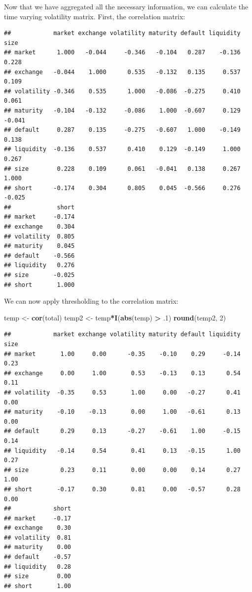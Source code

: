 \documentclass[11pt,]{article}
\newenvironment{Shaded}{\begin{snugshade}}{\end{snugshade}}
\newcommand{\DecValTok}[1]{\textcolor[rgb]{0.00,0.00,0.81}{#1}}
\newcommand{\FloatTok}[1]{\textcolor[rgb]{0.00,0.00,0.81}{#1}}
\newcommand{\KeywordTok}[1]{\textcolor[rgb]{0.13,0.29,0.53}{\textbf{#1}}}
\newcommand{\NormalTok}[1]{#1}
\newcommand{\OperatorTok}[1]{\textcolor[rgb]{0.81,0.36,0.00}{\textbf{#1}}}
\newcommand{\StringTok}[1]{\textcolor[rgb]{0.31,0.60,0.02}{#1}}
\renewenvironment{quote}{\begin{shaded*}}{\end{shaded*}}
\begin{document}
\begin{quote}
Now that we have aggregated all the necessary information, we can
calculate the time varying volatility matrix. First, the correlation
matrix:
\end{quote}

\begin{verbatim}
##            market exchange volatility maturity default liquidity   size
## market      1.000   -0.044     -0.346   -0.104   0.287    -0.136  0.228
## exchange   -0.044    1.000      0.535   -0.132   0.135     0.537  0.109
## volatility -0.346    0.535      1.000   -0.086  -0.275     0.410  0.061
## maturity   -0.104   -0.132     -0.086    1.000  -0.607     0.129 -0.041
## default     0.287    0.135     -0.275   -0.607   1.000    -0.149  0.138
## liquidity  -0.136    0.537      0.410    0.129  -0.149     1.000  0.267
## size        0.228    0.109      0.061   -0.041   0.138     0.267  1.000
## short      -0.174    0.304      0.805    0.045  -0.566     0.276 -0.025
##             short
## market     -0.174
## exchange    0.304
## volatility  0.805
## maturity    0.045
## default    -0.566
## liquidity   0.276
## size       -0.025
## short       1.000
\end{verbatim}

\begin{quote}
We can now apply thresholding to the correlation matrix:
\end{quote}

\begin{Shaded}
\begin{Highlighting}[]
\NormalTok{temp <-}\StringTok{ }\KeywordTok{cor}\NormalTok{(total)}
\NormalTok{temp2 <-}\StringTok{ }\NormalTok{temp}\OperatorTok{*}\KeywordTok{I}\NormalTok{(}\KeywordTok{abs}\NormalTok{(temp) }\OperatorTok{>}\StringTok{ }\FloatTok{.1}\NormalTok{)}
\KeywordTok{round}\NormalTok{(temp2, }\DecValTok{2}\NormalTok{)}
\end{Highlighting}
\end{Shaded}

\begin{verbatim}
##            market exchange volatility maturity default liquidity size
## market       1.00     0.00      -0.35    -0.10    0.29     -0.14 0.23
## exchange     0.00     1.00       0.53    -0.13    0.13      0.54 0.11
## volatility  -0.35     0.53       1.00     0.00   -0.27      0.41 0.00
## maturity    -0.10    -0.13       0.00     1.00   -0.61      0.13 0.00
## default      0.29     0.13      -0.27    -0.61    1.00     -0.15 0.14
## liquidity   -0.14     0.54       0.41     0.13   -0.15      1.00 0.27
## size         0.23     0.11       0.00     0.00    0.14      0.27 1.00
## short       -0.17     0.30       0.81     0.00   -0.57      0.28 0.00
##            short
## market     -0.17
## exchange    0.30
## volatility  0.81
## maturity    0.00
## default    -0.57
## liquidity   0.28
## size        0.00
## short       1.00
\end{verbatim}
\end{document}
